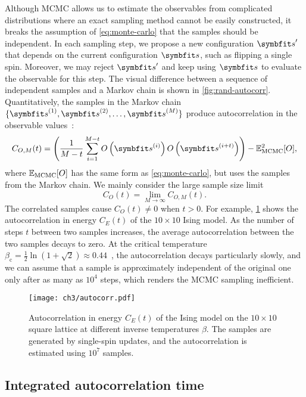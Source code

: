 Although MCMC allows us to estimate the observables from complicated distributions where an exact sampling method cannot be easily constructed, it breaks the assumption of \cref{eq:monte-carlo} that the samples should be independent. In each sampling step, we propose a new configuration $\vs'$ that depends on the current configuration $\vs$, such as flipping a single spin. Moreover, we may reject $\vs'$ and keep using $\vs$ to evaluate the observable for this step. The visual difference between a sequence of independent samples and a Markov chain is shown in \cref{fig:rand-autocorr}. Quantitatively, the samples in the Markov chain $\{\vs^{(1)}, \vs^{(2)}, \ldots, \vs^{(M)}\}$ produce autocorrelation in the observable values~\cite{muller1973dynamic}:
\begin{equation}
C_{O, M}(t) = \left( \frac{1}{M - t} \sum_{i = 1}^{M - t} O\left( \vs^{(i)} \right) O\left( \vs^{(i + t)} \right) \right) - \bbE_\text{MCMC}^2[O],
\end{equation}
where $\mathbb{E}_\text{MCMC}[O]$ has the same form as \cref{eq:monte-carlo}, but uses the samples from the Markov chain. We mainly consider the large sample size limit
\begin{equation}
C_O(t) = \lim_{M \to \infty} C_{O, M}(t).
\end{equation}
The correlated samples cause $C_O(t) \neq 0$ when $t > 0$. For example, \cref{fig:autocorr} shows the autocorrelation in energy $C_E(t)$ of the $10 \times 10$ Ising model. As the number of steps $t$ between two samples increases, the average autocorrelation between the two samples decays to zero. At the critical temperature $\beta_\text{c} = \frac{1}{2} \ln(1 + \sqrt{2}) \approx 0.44$~\cite{onsager1944crystal}, the autocorrelation decays particularly slowly, and we can assume that a sample is approximately independent of the original one only after as many as $10^4$ steps, which renders the MCMC sampling inefficient.

\begin{figure}[htb]
\centering
\texttt{[image: ch3/autocorr.pdf]}
\caption[Autocorrelation in energy for Ising model at different temperatures]{
Autocorrelation in energy $C_E(t)$ of the Ising model on the $10 \times 10$ square lattice at different inverse temperatures $\beta$. The samples are generated by single-spin updates, and the autocorrelation is estimated using $10^7$ samples.
}
\label{fig:autocorr}
\end{figure}

\subsection{Integrated autocorrelation time}

